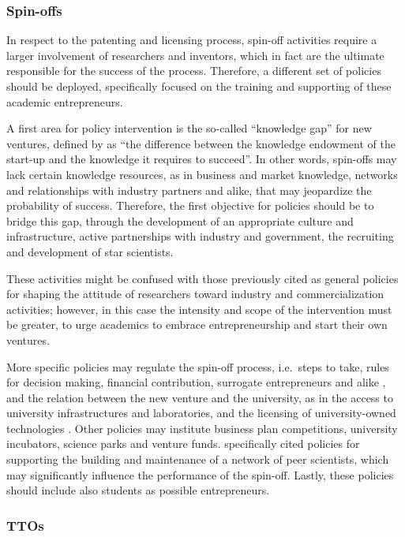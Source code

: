 \subsubsection{Spin-offs}

In respect to the patenting and licensing process, spin-off activities require a larger involvement of researchers and inventors, which in fact are the ultimate responsible for the success of the process. Therefore, a different set of policies should be deployed, specifically focused on the training and supporting of these academic entrepreneurs.

A first area for policy intervention is the so-called \enquote{knowledge gap} for new ventures, defined by \citet{Lockett2005a} as \enquote{the difference between the knowledge endowment of the start-up and the knowledge it requires to succeed}. In other words, spin-offs may lack certain knowledge resources, as in business and market knowledge, networks and relationships with industry partners and alike, that may jeopardize the probability of success. Therefore, the first objective for policies should be to bridge this gap, through the development of an appropriate culture and infrastructure, active partnerships with industry and government, the recruiting and development of star scientists. 

These activities might be confused with those previously cited as general policies for shaping the attitude of researchers toward industry and commercialization activities; however, in this case the intensity and scope of the intervention must be greater, to urge academics to embrace entrepreneurship and start their own ventures.

More specific policies may regulate the spin-off process, i.e.\ steps to take, rules for decision making, financial contribution, surrogate entrepreneurs and alike \citep{Franklin2001}, and the relation between the new venture and the university, as in the access to university infrastructures and laboratories, and the licensing of university-owned technologies \citep{Fini2009}. Other policies may institute business plan competitions, university incubators, science parks and venture funds. \citet{Siegel2007} specifically cited policies for supporting the building and maintenance of a network of peer scientists, which may significantly influence the performance of the spin-off. Lastly, these policies should include also students as possible entrepreneurs. 

\subsubsection{TTOs}


